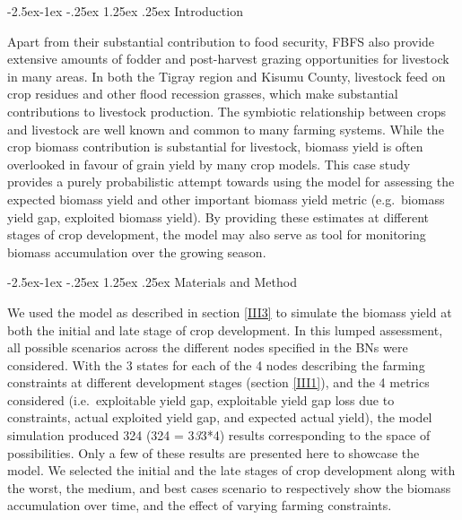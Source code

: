 \documentclass[12pt,oneside]{article}
\makeatletter
\renewcommand\paragraph{\@startsection{paragraph}{4}{\z@}%
            {-2.5ex\@plus -1ex \@minus -.25ex}%
            {1.25ex \@plus .25ex}%
            {\normalfont\normalsize\bfseries}}
\makeatother
\begin{document}
\hypertarget{IV221}{%
\paragraph{Introduction}\label{IV221}}

Apart from their substantial contribution to food security, FBFS also provide extensive amounts of fodder and post-harvest grazing opportunities for livestock in many areas. In both the Tigray region and Kisumu County, livestock feed on crop residues and other flood recession grasses, which make substantial contributions to livestock production. The symbiotic relationship between crops and livestock are well known and common to many farming systems. While the crop biomass contribution is substantial for livestock, biomass yield is often overlooked in favour of grain yield by many crop models. This case study provides a purely probabilistic attempt towards using the model for assessing the expected biomass yield and other important biomass yield metric (e.g.~biomass yield gap, exploited biomass yield). By providing these estimates at different stages of crop development, the model may also serve as tool for monitoring biomass accumulation over the growing season.

\hypertarget{IV222}{%
\paragraph{Materials and Method}\label{IV222}}

We used the model as described in section \ref{III3} to simulate the biomass yield at both the initial and late stage of crop development. In this lumped assessment, all possible scenarios across the different nodes specified in the BNs were considered. With the 3 states for each of the 4 nodes describing the farming constraints at different development stages (section \ref{III1}), and the 4 metrics considered (i.e.~exploitable yield gap, exploitable yield gap loss due to constraints, actual exploited yield gap, and expected actual yield), the model simulation produced 324 (324 = 3\emph{3}3*4) results corresponding to the space of possibilities. Only a few of these results are presented here to showcase the model. We selected the initial and the late stages of crop development along with the worst, the medium, and best cases scenario to respectively show the biomass accumulation over time, and the effect of varying farming constraints.
\end{document}

